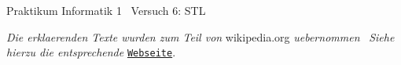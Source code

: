 Praktikum Informatik 1~\newline
Versuch 6\+: S\+TL

{\itshape Die erklaerenden Texte wurden zum Teil von} wikipedia.\+org {\itshape uebernommen}~\newline
{\itshape Siehe hierzu die entsprechende} \href{https://en.wikipedia.org/wiki/Stack_(abstract_data_type)}{\tt Webseite}. 